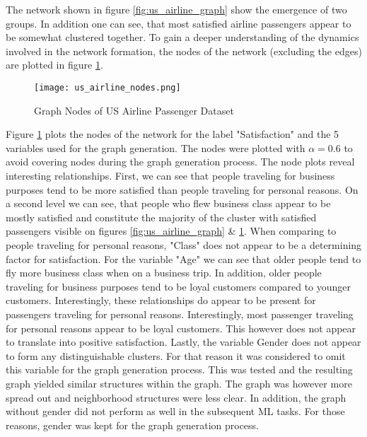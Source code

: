   \noindent The network shown in figure \ref{fig:us_airline_graph} show the
  emergence of two groups. In addition one can see, that most satisfied airline
  passengers appear to be somewhat clustered together. To gain a deeper
  understanding of the dynamics involved in the network formation, the nodes of
  the network (excluding the edges) are plotted in figure
  \ref{fig:us_airline_nodes}.

  \begin{figure}[h]
	  \centering
	  \texttt{[image: us\_airline\_nodes.png]}
	  \caption{Graph Nodes of US Airline Passenger Dataset}
      \label{fig:us_airline_nodes}
  \end{figure}

  \noindent Figure \ref{fig:us_airline_nodes} plots the nodes of the network
  for the label "Satisfaction" and the 5 variables used for the graph
  generation. The nodes were plotted with $\alpha = 0.6$ to avoid covering
  nodes during the graph generation process. The node plots reveal interesting
  relationships. First, we can see that people traveling for business purposes
  tend to be more satisfied than people traveling for personal reasons. On a
  second level we can see, that people who flew business class appear to be
  mostly satisfied and constitute the majority of the cluster with satisfied
  passengers visible on figures \ref{fig:us_airline_graph} \&
  \ref{fig:us_airline_nodes}. When comparing to people traveling for personal
  reasons, "Class" does not appear to be a determining factor for satisfaction.
  For the variable "Age" we can see that older people tend to fly more business
  class when on a business trip. In addition, older people traveling for
  business purposes tend to be loyal customers compared to younger customers.
  Interestingly, these relationships do appear to be present for passengers
  traveling for personal reasons. Interestingly, most passenger traveling for
  personal reasons appear to be loyal customers. This however does not appear
  to translate into positive satisfaction. Lastly, the variable Gender does not
  appear to form any distinguishable clusters. For that reason it was
  considered to omit this variable for the graph generation process. This was
  tested and the resulting graph yielded similar structures within the graph.
  The graph was however more spread out and neighborhood structures were less
  clear. In addition, the graph without gender did not perform as well in the
  subsequent ML tasks. For those reasons, gender was kept for the graph
  generation process. \\


